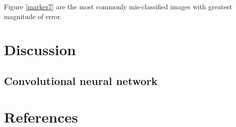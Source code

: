 \documentclass[10pt,letterpaper]{article}
\begin{document}
Figure \ref{marker7} are the most commonly mis-classified images 
with greatest magnitude of error.


\section*{Discussion}

\subsection*{Convolutional neural network}

\section*{References}



\end{document}
